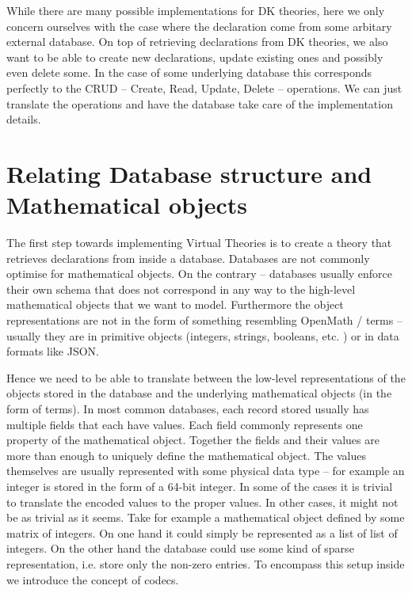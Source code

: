 \documentclass{deliverablereport}
\begin{document}
While there are many possible implementations for DK theories, here we only concern ourselves with the case where the declaration come from some arbitary external database. On top of retrieving declarations from DK theories, we also want to be able to create new declarations, update existing ones and possibly even delete some. In the case of some underlying database this corresponds perfectly to the CRUD -- Create, Read, Update, Delete -- operations. We can just translate the operations and have the database take care of the implementation details. 

\section{Relating Database structure and Mathematical objects}\label{sec:impl}

The first step towards implementing Virtual Theories is to create a theory that retrieves declarations from inside a database. Databases are not commonly optimise for mathematical objects. On the contrary -- databases usually enforce their own schema that does not correspond in any way to the high-level mathematical objects that we want to model. Furthermore the object representations are not in the form of something resembling OpenMath / \MMT terms -- usually they are in primitive objects (integers, strings, booleans, etc. ) or in data formats like JSON.

Hence we need to be able to translate between the low-level representations of the objects stored in the database and the underlying mathematical objects (in the form of \MMT terms). In most common databases, each record stored usually has multiple fields that each have values. Each field commonly represents one property of the mathematical object. Together the fields and their values are more than enough to uniquely define the mathematical object. The values themselves are usually represented with some physical data type -- for example an integer is stored in the form of a 64-bit integer. In some of the cases it is trivial to translate the encoded values to the proper values. In other cases, it might not be as trivial as it seems. Take for example a mathematical object defined by some matrix of integers. On one hand it could simply be represented as a list of list of integers. On the other hand the database could use some kind of sparse representation, i.e. store only the non-zero entries. To encompass this setup inside \MMT we introduce the concept of codecs.
\end{document}
